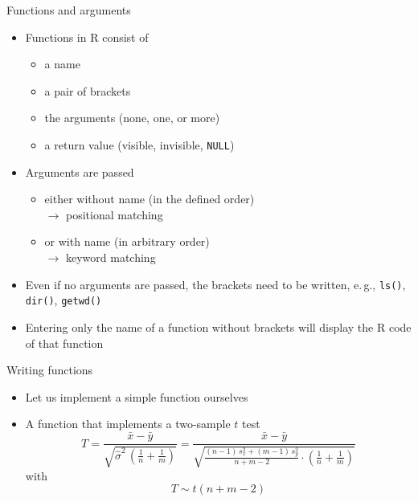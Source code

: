 \documentclass[aspectratio=169]{beamer}
\begin{document}
\begin{frame}{Functions and arguments}
  \begin{itemize}
    \item Functions in R consist of
    \begin{itemize}
    \item a name
    \item a pair of brackets
    \item the arguments (none, one, or more)
    \item a return value (visible, invisible, \texttt{NULL})
    \end{itemize}
    \item Arguments are passed
    \begin{itemize}
      \item either without name (in the defined order)\\
        $\to$ positional matching
      \item or with name (in arbitrary order)\\
        $\to$ keyword matching
    \end{itemize}
    \item Even if no arguments are passed, the brackets need to be written,
      e.\,g., \texttt{ls()}, \texttt{dir()}, \texttt{getwd()}
    \item Entering only the name of a function without brackets will
      display the R code of that function
  \end{itemize}
\end{frame}

\begin{frame}{Writing functions}
  \begin{itemize}
    \item Let us implement a simple function ourselves
    \item A function that implements a two-sample $t$ test
      \begin{equation*}
  T = \frac{\bar{x} - \bar{y}}
      {\sqrt{\hat{\sigma}^2\, \left(\frac{1}{n} + \frac{1}{m}\right)}}
    = \frac{\bar{x} - \bar{y}}
      {\sqrt{\frac{(n-1) \, s_x^2 + (m-1) \, s_y^2}
          {n+m-2}\cdot \left(\frac{1}{n} + \frac{1}{m}\right)}}
      \end{equation*}
      with
      \begin{equation*}
        T \sim t(n+m-2)
      \end{equation*}
  \end{itemize}
\end{frame}
\end{document}
